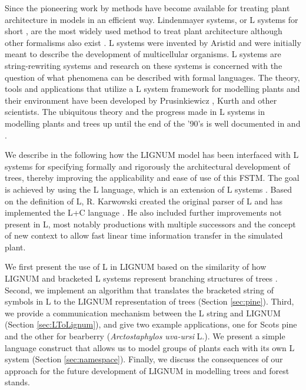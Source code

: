Since  the pioneering  work  by \citet{honda:71}  methods have  become
available for  treating plant architecture  in models in  an efficient
way.  Lindenmayer  systems, or L systems for  short \citep{pp:89}, are
the most widely used method to treat plant architecture although other
formalisms   also  exist  \citep[e.g.][]{dereffye:97,   godin:99}.   L
systems    were    invented    by    Aristid    \citet{lindenmayer:68,
  lindenmayer:71} and were initially meant to describe the development
of  multicellular organisms.  L  systems are  string-rewriting systems
and research on  these systems is concerned with  the question of what
phenomena can  be described with formal languages.   The theory, tools
and  applications that  utilize  a L  system  framework for  modelling
plants  and their  environment  have been  developed by  Prusinkiewicz
\citep{pp:89,pp:92}, Kurth \citep{kurth:94} and other scientists.  The
ubiquitous  theory and  the progress  made in  L systems  in modelling
plants and trees  up until the end of the '90's  is well documented in
\citet{pp:90,pp:99} and \citet{kurth:99}.

We describe in the following  how the LIGNUM model has been interfaced
with   L  systems   for   specifying  formally   and  rigorously   the
architectural   development   of    trees,   thereby   improving   the
applicability and ease  of use of this FSTM.  The  goal is achieved by
using  the   L  language,   which  is  an   extension  of   L  systems
\citep{pp:99a}.  Based  on the definition of L,  R.  Karwowski created
the  original  parser  of  L  and has  implemented  the  L+C  language
\citep{karwowski:02}.  He  also   included  further  improvements  not
present in  L, most notably  productions with multiple  successors and
the concept  of new context \citep{karwowski:03} to  allow fast linear
time information transfer in the simulated plant.

We first present the use of L in LIGNUM based on the similarity of how
LIGNUM and bracketed L systems represent branching structures of trees
\citep{perttunen:96, perttunen:01}.  Second, we implement an algorithm
that translates  the bracketed  string of symbols  in L to  the LIGNUM
representation of trees (Section \ref{sec:pine}).  Third, we provide a
communication  mechanism  between the  L  string  and LIGNUM  (Section
\ref{sec:LToLignum}), and give two example applications, one for Scots
pine  and the  other for  bearberry  (\textit{Arctostaphylos uva-ursi}
L.).  We present  a simple language construct that  allows us to model
groups   of   plants   each   with   its   own   L   system   (Section
\ref{sec:namespace}).   Finally, we  discuss the  consequences  of our
approach for the  future development of LIGNUM in  modelling trees and
forest stands.

